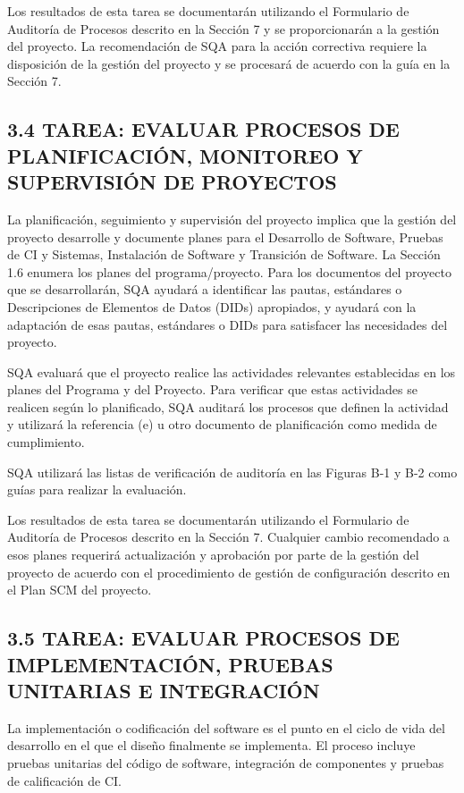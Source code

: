 Los resultados de esta tarea se documentarán utilizando el Formulario de Auditoría de Procesos descrito en la Sección 7 y se proporcionarán a la gestión del proyecto. La recomendación de SQA para la acción correctiva requiere la disposición de la gestión del proyecto y se procesará de acuerdo con la guía en la Sección 7.

\subsection{3.4 TAREA: EVALUAR PROCESOS DE PLANIFICACIÓN, MONITOREO Y SUPERVISIÓN DE PROYECTOS}
La planificación, seguimiento y supervisión del proyecto implica que la gestión del proyecto desarrolle y documente planes para el Desarrollo de Software, Pruebas de CI y Sistemas, Instalación de Software y Transición de Software. La Sección 1.6 enumera los planes del programa/proyecto. Para los documentos del proyecto que se desarrollarán, SQA ayudará a identificar las pautas, estándares o Descripciones de Elementos de Datos (DIDs) apropiados, y ayudará con la adaptación de esas pautas, estándares o DIDs para satisfacer las necesidades del proyecto.

SQA evaluará que el proyecto realice las actividades relevantes establecidas en los planes del Programa y del Proyecto. Para verificar que estas actividades se realicen según lo planificado, SQA auditará los procesos que definen la actividad y utilizará la referencia (e) u otro documento de planificación como medida de cumplimiento.

SQA utilizará las listas de verificación de auditoría en las Figuras B-1 y B-2 como guías para realizar la evaluación.

Los resultados de esta tarea se documentarán utilizando el Formulario de Auditoría de Procesos descrito en la Sección 7. Cualquier cambio recomendado a esos planes requerirá actualización y aprobación por parte de la gestión del proyecto de acuerdo con el procedimiento de gestión de configuración descrito en el Plan SCM del proyecto.

\subsection{3.5 TAREA: EVALUAR PROCESOS DE IMPLEMENTACIÓN, PRUEBAS UNITARIAS E INTEGRACIÓN}
La implementación o codificación del software es el punto en el ciclo de vida del desarrollo en el que el diseño finalmente se implementa. El proceso incluye pruebas unitarias del código de software, integración de componentes y pruebas de calificación de CI.

